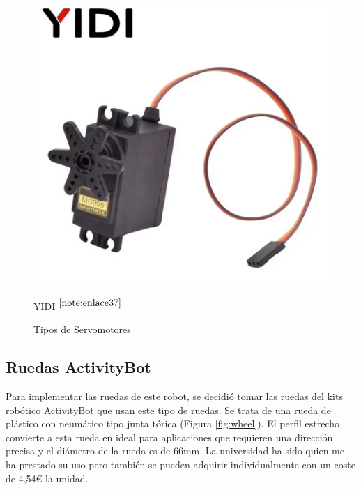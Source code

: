 \begin{figure}[ht!]
\begin{minipage}{0.33\linewidth}
		\includegraphics[width=\linewidth]{figs/diyi.png}
		\caption*{\centering YIDI $^{\ref{note:enlace37}}$} %
	\end{minipage}
	\caption{Tipos de Servomotores}
	\label{fig:parallax}
\end{figure}


\setcounter{footnote}{36} %

\setcounter{footnote}{37} %


\subsection{Ruedas ActivityBot}

Para implementar las ruedas de este robot, se decidió tomar las ruedas del kits robótico ActivityBot que usan este tipo de ruedas. Se trata de una rueda de plástico con neumático tipo junta tórica (Figura \ref{fig:wheel}). El perfil estrecho convierte a esta rueda en ideal para aplicaciones que requieren una dirección precisa y el diámetro de la rueda es de 66mm. La universidad ha sido quien me ha prestado su uso pero también se pueden adquirir individualmente con un coste de 4,54€ la unidad.

